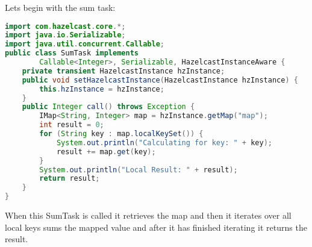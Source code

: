 Lets begin with the sum task:
\begin{lstlisting}[language=java]
import com.hazelcast.core.*;
import java.io.Serializable;
import java.util.concurrent.Callable;
public class SumTask implements
        Callable<Integer>, Serializable, HazelcastInstanceAware {
    private transient HazelcastInstance hzInstance;
    public void setHazelcastInstance(HazelcastInstance hzInstance) {
        this.hzInstance = hzInstance;
    }
    public Integer call() throws Exception {
        IMap<String, Integer> map = hzInstance.getMap("map");
        int result = 0;
        for (String key : map.localKeySet()) {
            System.out.println("Calculating for key: " + key);
            result += map.get(key);
        }
        System.out.println("Local Result: " + result);
        return result;
    }
}
\end{lstlisting}
When this SumTask is called it retrieves the map and then it iterates over all local keys sums the mapped value and after it has finished iterating it returns the result.

